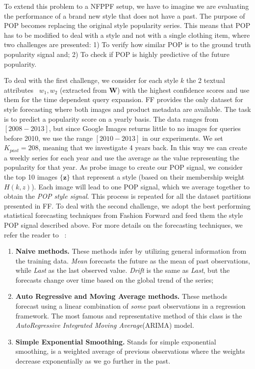 \documentclass[runningheads]{llncs}
\newcommand{\snamebig}[0] {POP\xspace}
\begin{document}
To extend this problem to a NFPPF setup, we have to imagine we are evaluating the performance of a brand new style that does not have a past. The purpose of \snamebig becomes replacing the original style popularity series. This means that POP has to be modified to deal with a style and not with a single clothing item, where two challenges are presented: 1) To verify how similar \snamebig is to the ground truth popularity signal and; 2) To check if \snamebig is highly predictive of the future popularity.



To deal with the first challenge, we consider for each style $k$ the 2 textual attributes~\cite{liuLQWTcvpr16DeepFashion} $w_1, w_2$ (extracted from $\mathbf{W}$) with the highest confidence scores and use them for the time dependent query expansion. FF provides the only dataset for style forecasting where both images and product metadata are available. The task is to predict a popularity score on a yearly basis. The data ranges from $[2008-2013]$, but since Google Images returns little to no images for queries before 2010, we use the range $[2010-2013]$ in our experiments. We set $K_{past} = 208$, meaning that we investigate 4 years back. In this way we can create a weekly series for each year and use the average as the value representing the popularity for that year. As probe image to create our \snamebig signal, we consider the top 10 images $\{\mathbf{z}\}$ that represent a style (based on their membership weight $H(k,z)$). Each image will lead to one \snamebig signal, which we average together to obtain the \emph{\snamebig style signal}. This process is repeated for all the dataset partitions presented in FF. To deal with the second challenge, we adopt the best performing statistical forecasting techniques from Fashion Forward and feed them the style \snamebig signal described above. For more details on the forecasting techniques, we refer the reader to ~\cite{FPAP2,TSA}:
\begin{enumerate}
    \item \textbf{Naive methods.} These methods infer by utilizing general information from the training data. \emph{Mean} forecasts the future as the mean of past observations, while \emph{Last} as the last observed value. \emph{Drift} is the same as \emph{Last}, but the forecasts change over time based on the global trend of the series;
    \item \textbf{Auto Regressive and Moving Average methods.} These methods forecast using a linear combination of \emph{some} past observations in a regression framework. The most famous and representative method of this class is the \emph{AutoRegressive Integrated Moving Average}(ARIMA) model.
    \item \textbf{Simple Exponential Smoothing.} Stands for simple exponential smoothing, is a weighted average of previous observations where the weights decrease exponentially as we go further in the past.
\end{enumerate}
\end{document}
